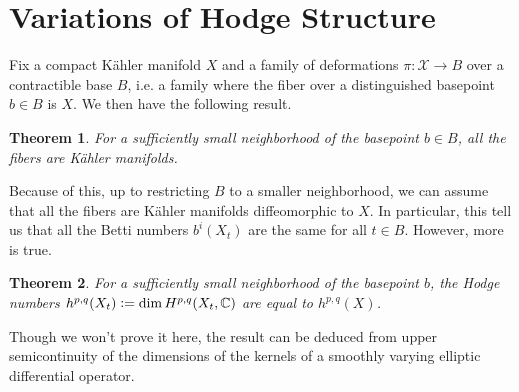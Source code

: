 \documentclass[psamsfonts, 12pt]{amsart}
\newtheorem{thm}{Theorem}[section]
\theoremstyle{definition}
\theoremstyle{remark}
\newcommand{\C}{\mathbb{C}}
\newcommand{\defeq}{\vcentcolon=}
\begin{document}
\section{Variations of Hodge Structure}
%
Fix a compact K\"ahler manifold $X$ and a family of deformations
$\pi : \mathcal{X} \to B$ over a contractible base $B$, i.e. a family
where the fiber over a distinguished basepoint $b \in B$ is $X$. We then
have the following result.
%
\begin{thm}
For a sufficiently small neighborhood of the basepoint $b \in B$, all the
fibers are K\"ahler manifolds.
\end{thm}
%
Because of this, up to restricting $B$ to a smaller neighborhood, we can
assume that all the fibers are K\"ahler manifolds diffeomorphic to $X$. In
particular, this tell us that all the Betti numbers $b^i(X_t)$ are the
same for all $t \in B$. However, more is true.
%
\begin{thm}
For a sufficiently small neighborhood of the basepoint $b$, the Hodge numbers
$h^{p,q}(X_t) \defeq \dim H^{p,q}(X_t,\C)$ are equal to $h^{p,q}(X)$.
\end{thm}
%
Though we won't prove it here, the result can be deduced from upper semicontinuity
of the dimensions of the kernels of a smoothly varying elliptic differential
operator. \\
\end{document}
